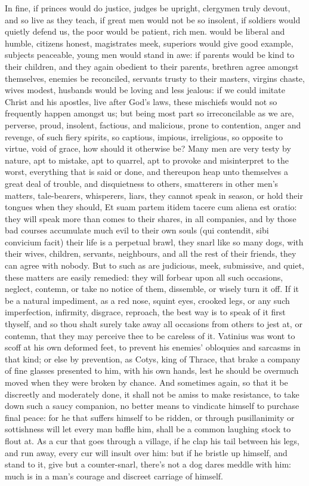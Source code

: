 {In fine, if princes would do justice, judges be upright, clergymen
truly devout, and so live as they teach, if great men would not be so
insolent, if soldiers would quietly defend us, the poor would be
patient, rich men. would be liberal and humble, citizens honest,
magistrates meek, superiors would give good example, subjects
peaceable, young men would stand in awe: if parents would be kind to
their children, and they again obedient to their parents, brethren
agree amongst themselves, enemies be reconciled, servants trusty to
their masters, virgins chaste, wives modest, husbands would be loving
and less jealous: if we could imitate Christ and his apostles, live
after God's laws, these mischiefs would not so frequently happen
amongst us; but being most part so irreconcilable as we are, perverse,
proud, insolent, factious, and malicious, prone to contention, anger
and revenge, of such fiery spirits, so captious, impious, irreligious,
so opposite to virtue, void of grace, how should it otherwise be? Many
men are very testy by nature, apt to mistake, apt to quarrel, apt to
provoke and misinterpret to the worst, everything that is said or done,
and thereupon heap unto themselves a great deal of trouble, and
disquietness to others, smatterers in other men's matters,
tale-bearers, whisperers, liars, they cannot speak in season, or hold
their tongues when they should, Et suam partem itidem tacere cum
aliena est oratio: they will speak more than comes to their shares, in
all companies, and by those bad courses accumulate much evil to their
own souls (qui contendit, sibi convicium facit) their life is a
perpetual brawl, they snarl like so many dogs, with their wives,
children, servants, neighbours, and all the rest of their friends, they
can agree with nobody. But to such as are judicious, meek, submissive,
and quiet, these matters are easily remedied: they will forbear upon
all such occasions, neglect, contemn, or take no notice of them,
dissemble, or wisely turn it off. If it be a natural impediment, as a
red nose, squint eyes, crooked legs, or any such imperfection,
infirmity, disgrace, reproach, the best way is to speak of it first
thyself, and so thou shalt surely take away all occasions from
others to jest at, or contemn, that they may perceive thee to be
careless of it. Vatinius was wont to scoff at his own deformed feet, to
prevent his enemies' obloquies and sarcasms in that kind; or else by
prevention, as Cotys, king of Thrace, that brake a company of fine
glasses presented to him, with his own hands, lest he should be
overmuch moved when they were broken by chance. And sometimes again, so
that it be discreetly and moderately done, it shall not be amiss to
make resistance, to take down such a saucy companion, no better means
to vindicate himself to purchase final peace: for he that suffers
himself to be ridden, or through pusillanimity or sottishness will let
every man baffle him, shall be a common laughing stock to flout at. As
a cur that goes through a village, if he clap his tail between his
legs, and run away, every cur will insult over him: but if he bristle
up himself, and stand to it, give but a counter-snarl, there's not a
dog dares meddle with him: much is in a man's courage and discreet
carriage of himself.

}
